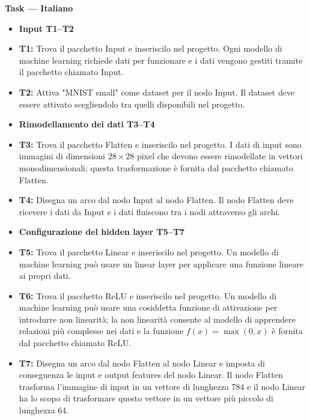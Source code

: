 \documentclass[10pt,a4paper]{article}
\newcommand{\taskgroup}[2]{%
    \item[] {\color{groupcolor}\small\bfseries
    #1 \hfill \normalfont\footnotesize #2}%
}
\begin{document}
\begin{minipage}[t]{0.48\textwidth}

{\large\bfseries Task — Italiano}

\vspace{5pt}

\begin{itemize}
    \taskgroup{Input}{T1--T2}

    \item \textbf{T1:} Trova il pacchetto Input e inseriscilo nel progetto. Ogni modello di machine learning richiede dati per funzionare e i dati vengono gestiti tramite il pacchetto chiamato Input.

    \item \textbf{T2:} Attiva "MNIST small" come dataset per il nodo Input. Il dataset deve essere attivato scegliendolo tra quelli disponibili nel progetto.

    \taskgroup{Rimodellamento dei dati}{T3--T4}

    \item \textbf{T3:} Trova il pacchetto Flatten e inseriscilo nel progetto. I dati di input sono immagini di dimensioni \(28 \times 28\) pixel che devono essere rimodellate in vettori monodimensionali; questa trasformazione è fornita dal pacchetto chiamato Flatten.

    \item \textbf{T4:} Disegna un arco dal nodo Input al nodo Flatten. Il nodo Flatten deve ricevere i dati da Input e i dati fluiscono tra i nodi attraverso gli archi.

    \taskgroup{Configurazione del hidden layer}{T5--T7}

    \item \textbf{T5:} Trova il pacchetto Linear e inseriscilo nel progetto. Un modello di machine learning può usare un linear layer per applicare una funzione lineare ai propri dati.

    \item \textbf{T6:} Trova il pacchetto ReLU e inseriscilo nel progetto. Un modello di machine learning può usare una cosiddetta funzione di attivazione per introdurre non linearità; la non linearità consente al modello di apprendere relazioni più complesse nei dati e la funzione \(f(x) = \max(0, x)\) è fornita dal pacchetto chiamato ReLU.

    \item \textbf{T7:} Disegna un arco dal nodo Flatten al nodo Linear e imposta di conseguenza le input e output features del nodo Linear. Il nodo Flatten trasforma l'immagine di input in un vettore di lunghezza 784 e il nodo Linear ha lo scopo di trasformare questo vettore in un vettore più piccolo di lunghezza 64.


\end{itemize}
\end{minipage}
\end{document}
